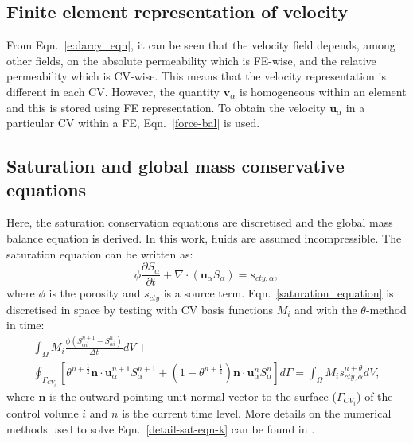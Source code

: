 \documentclass[times]{fldauth}
\begin{document}
\subsection{Finite element representation of velocity} \label{Section:Force_density}
From Eqn.~\ref{e:darcy_eqn}, it can be seen that the velocity field depends, among other fields, on the absolute permeability which is FE-wise, and the relative permeability which is CV-wise. This means that the velocity representation is different in each CV. However, the quantity $\mathbf{v}_\alpha$ is homogeneous within an element and this is stored using FE representation. To obtain the velocity $\mathbf{u}_{\alpha}$ in a particular CV within a FE, Eqn.~\ref{force-bal} is used.


\subsection{Saturation and global mass conservative equations} \label{Section:Saturation_Global}
Here, the saturation conservation equations are discretised and the
global mass balance equation is derived. In this work, fluids are
assumed incompressible. The saturation equation can be written as:
\begin{equation}
  \phi\displaystyle\frac{\partial S_{\alpha} }{\partial t} + \nabla
  \cdot \left( {\mathbf u}_{\alpha} S_{\alpha}\right) =
  s_{cty,\alpha},
  \label{saturation_equation}
\end{equation}
where $\phi$ is the porosity and $s_{cty}$ is a source
term. Eqn.~\ref{saturation_equation} is discretised in space by
testing with CV basis functions $M_{i}$ and with the $\theta$-method
in time:
\begin{eqnarray}
  \int_{\Omega} M_{i} \displaystyle\frac{\phi \left({S_{\alpha
        i}^{n+1}}-{S_{\alpha i}^{n}}\right)}{\Delta t} dV + \nonumber
  \\ \oint_{\Gamma_{CV_{i}}} \left[\theta^{n+\frac{1}{2}} {\mathbf n}
    \cdot {\mathbf u}_{\alpha}^{n+1} S_{\alpha}^{n+1} +
    \left(1-\theta^{n+\frac{1}{2}}\right) {\mathbf n} \cdot {\mathbf
      u}_{\alpha}^{n} S_{\alpha}^{n} \right]d\Gamma = \int_{\Omega}
  M_{i} {s_{cty,\alpha}^{n+\theta}} dV,
  \label{detail-sat-eqn-k}
\end{eqnarray}
where $\mathbf{n}$ is the outward-pointing unit normal vector to the
surface ($\Gamma_{CV_{i}}$) of the control volume $i$ and $n$ is the
current time level. More details on the numerical methods used to
solve Eqn.~\ref{detail-sat-eqn-k} can be found in
\cite{pavlidis_2013b}.
\end{document}

